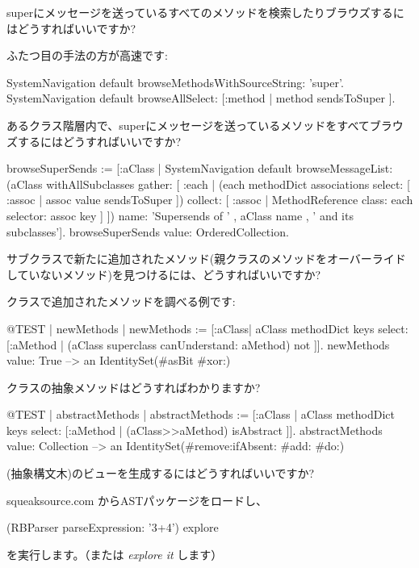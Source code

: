 \documentclass[a4paper,10pt,twoside]{book}
\begin{document}
\begin{faq}
superにメッセージを送っているすべてのメソッドを検索したりブラウズするにはどうすればいいですか?
\end{faq}
\answer
ふたつ目の手法の方が高速です:
\begin{code}{}
SystemNavigation default browseMethodsWithSourceString: 'super'.
SystemNavigation default browseAllSelect: [:method | method sendsToSuper ].
\end{code}

\begin{faq}
あるクラス階層内で、superにメッセージを送っているメソッドをすべてブラウズするにはどうすればいいですか?
\end{faq}
\answer
\begin{code}{}
browseSuperSends := [:aClass | SystemNavigation default
	browseMessageList: (aClass withAllSubclasses gather: [ :each |
		(each methodDict associations
			select: [ :assoc | assoc value sendsToSuper ])
				collect: [ :assoc | MethodReference class: each selector: assoc key ] ])
	name: 'Supersends of ' , aClass name , ' and its subclasses'].
browseSuperSends value: OrderedCollection.
\end{code}

\begin{faq}
サブクラスで新たに追加されたメソッド(親クラスのメソッドをオーバーライドしていないメソッド)を見つけるには、どうすればいいですか?
\end{faq}
\answer
{}クラスで追加されたメソッドを調べる例です:
\begin{code}{@TEST | newMethods |}
newMethods := [:aClass| aClass methodDict keys select:
	[:aMethod | (aClass superclass canUnderstand: aMethod) not ]].
newMethods value: True --> an IdentitySet(#asBit #xor:)
\end{code}

\begin{faq}
クラスの抽象メソッドはどうすればわかりますか?
\end{faq}
\answer
\begin{code}{@TEST | abstractMethods |}
abstractMethods :=
	[:aClass | aClass methodDict keys select:
		[:aMethod | (aClass>>aMethod) isAbstract ]].
abstractMethods value: Collection --> an IdentitySet(#remove:ifAbsent: #add: #do:)
\end{code}

\begin{faq}
(抽象構文木)のビューを生成するにはどうすればいいですか?
\end{faq}
\answer
squeaksource.com からASTパッケージをロードし、
\begin{code}{}
(RBParser parseExpression: '3+4') explore
\end{code}
を実行します。（または \emph{explore it} します）
\end{document}
